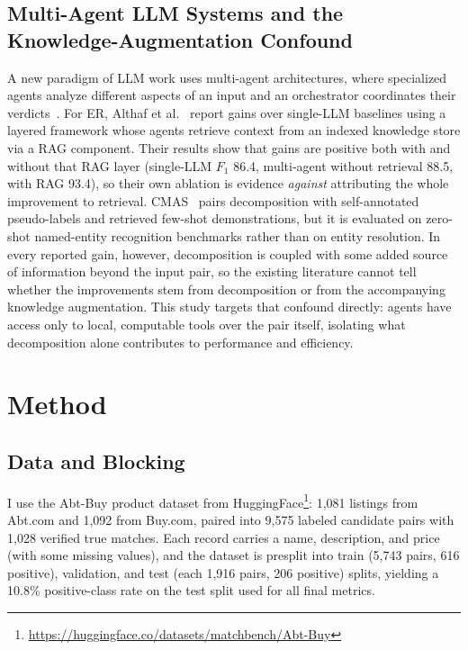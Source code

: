\documentclass[sigconf]{acmart}
\begin{document}
\subsection{Multi-Agent LLM Systems and the Knowledge-Augmentation Confound}
A new paradigm of LLM work uses multi-agent architectures, where specialized agents analyze different aspects of an input and an orchestrator coordinates their verdicts~\cite{guo2024large}.
For ER, Althaf et al.~\cite{althaf2025multi} report gains over single-LLM baselines using a layered framework whose agents retrieve context from an indexed knowledge store via a RAG component. Their results show that gains are positive both with and without that RAG layer (single-LLM $F_1$ 86.4, multi-agent without retrieval 88.5, with RAG 93.4), so their own ablation is evidence \emph{against} attributing the whole improvement to retrieval.
CMAS~\cite{wang2025cooperative} pairs decomposition with self-annotated pseudo-labels and retrieved few-shot demonstrations, but it is evaluated on zero-shot named-entity recognition benchmarks rather than on entity resolution.
In every reported gain, however, decomposition is coupled with some added source of information beyond the input pair, so the existing literature cannot tell whether the improvements stem from decomposition or from the accompanying knowledge augmentation.
This study targets that confound directly: agents have access only to local, computable tools over the pair itself, isolating what decomposition alone contributes to performance and efficiency.


\section{Method}
\label{sec:method}

\subsection{Data and Blocking}
I use the Abt-Buy product dataset from HuggingFace\footnote{\url{https://huggingface.co/datasets/matchbench/Abt-Buy}}: 1,081 listings from Abt.com and 1,092 from Buy.com, paired into 9,575 labeled candidate pairs with 1,028 verified true matches.
Each record carries a name, description, and price (with some missing values), and the dataset is presplit into train (5,743 pairs, 616 positive), validation, and test (each 1,916 pairs, 206 positive) splits, yielding a 10.8\% positive-class rate on the test split used for all final metrics.
\end{document}
